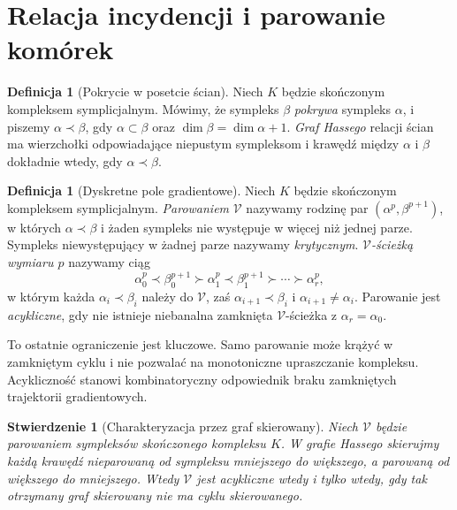 \documentclass[11pt,a4paper]{report}
\numberwithin{equation}{section}
\theoremstyle{plain}
\newtheorem{stwierdzenie}[twierdzenie]{Stwierdzenie}
\theoremstyle{definition}
\newtheorem{definicja}[twierdzenie]{Definicja}
\theoremstyle{remark}
\begin{document}
\section{Relacja incydencji i parowanie komórek}
\label{sec:tg-forman-matching}

\begin{definicja}[Pokrycie w posetcie ścian]
Niech $K$ będzie skończonym kompleksem symplicjalnym.
Mówimy, że sympleks $\beta$ \emph{pokrywa} sympleks
$\alpha$, i piszemy $\alpha\prec\beta$, gdy
$\alpha\subset\beta$ oraz
$\dim\beta=\dim\alpha+1$. \emph{Graf Hassego}
relacji ścian ma wierzchołki odpowiadające niepustym
sympleksom i krawędź między $\alpha$ i $\beta$
dokładnie wtedy, gdy $\alpha\prec\beta$.
\end{definicja}

\begin{definicja}[Dyskretne pole gradientowe]
\label{def:tg-discrete-morse-field}
Niech $K$ będzie skończonym kompleksem symplicjalnym.
\emph{Parowaniem} $\mathcal V$ nazywamy rodzinę par
$(\alpha^p,\beta^{p+1})$, w których
$\alpha\prec\beta$ i żaden sympleks nie występuje
w więcej niż jednej parze. Sympleks niewystępujący
w żadnej parze nazywamy \emph{krytycznym}.
\emph{$\mathcal V$-ścieżką wymiaru $p$} nazywamy ciąg
\[
\alpha_0^p\prec\beta_0^{p+1}\succ\alpha_1^p
\prec\beta_1^{p+1}\succ\cdots\succ\alpha_r^p,
\]
w którym każda $\alpha_i\prec\beta_i$ należy do
$\mathcal V$, zaś $\alpha_{i+1}\prec\beta_i$ i
$\alpha_{i+1}\ne\alpha_i$. Parowanie jest
\emph{acykliczne}, gdy nie istnieje niebanalna
zamknięta $\mathcal V$-ścieżka z
$\alpha_r=\alpha_0$.
\end{definicja}

To ostatnie ograniczenie jest kluczowe. Samo parowanie
może krążyć w zamkniętym cyklu i nie pozwalać na
monotoniczne upraszczanie kompleksu. Acykliczność
stanowi kombinatoryczny odpowiednik braku zamkniętych
trajektorii gradientowych.

\begin{stwierdzenie}[Charakteryzacja przez graf skierowany]
\label{thm:tg-morse-acyclic}
Niech $\mathcal V$ będzie parowaniem sympleksów
skończonego kompleksu $K$. W grafie Hassego skierujmy
każdą krawędź nieparowaną od sympleksu mniejszego do
większego, a parowaną od większego do mniejszego.
Wtedy $\mathcal V$ jest acykliczne wtedy i tylko wtedy,
gdy tak otrzymany graf skierowany nie ma cyklu skierowanego.
\end{stwierdzenie}
\end{document}
